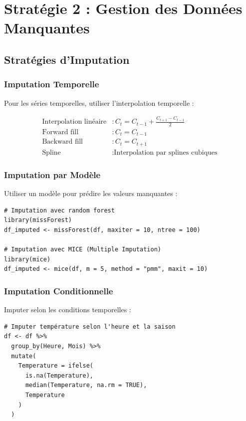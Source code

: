 \documentclass[12pt,a4paper]{article}
\begin{document}
\section{Stratégie 2 : Gestion des Données Manquantes}

\subsection{Stratégies d'Imputation}

\subsubsection{Imputation Temporelle}

Pour les séries temporelles, utiliser l'interpolation temporelle :

\begin{align}
    \text{Interpolation linéaire} &: C_t = C_{t-1} + \frac{C_{t+1} - C_{t-1}}{2} \\
    \text{Forward fill} &: C_t = C_{t-1} \\
    \text{Backward fill} &: C_t = C_{t+1} \\
    \text{Spline} &: \text{Interpolation par splines cubiques}
\end{align}

\subsubsection{Imputation par Modèle}

Utiliser un modèle pour prédire les valeurs manquantes :

\begin{verbatim}
# Imputation avec random forest
library(missForest)
df_imputed <- missForest(df, maxiter = 10, ntree = 100)

# Imputation avec MICE (Multiple Imputation)
library(mice)
df_imputed <- mice(df, m = 5, method = "pmm", maxit = 10)
\end{verbatim}

\subsubsection{Imputation Conditionnelle}

Imputer selon les conditions temporelles :

\begin{verbatim}
# Imputer température selon l'heure et la saison
df <- df %>%
  group_by(Heure, Mois) %>%
  mutate(
    Temperature = ifelse(
      is.na(Temperature),
      median(Temperature, na.rm = TRUE),
      Temperature
    )
  )
\end{verbatim}
\end{document}
